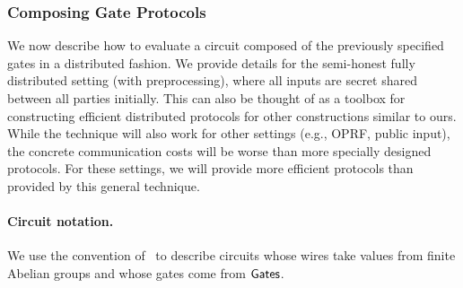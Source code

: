 \iffull
\subsubsection{Composing Gate Protocols}
We now describe how to evaluate a circuit composed of the previously specified gates in a distributed fashion. We provide details for the semi-honest fully distributed setting (with preprocessing), where all inputs are secret shared between all parties initially. This can also be thought of as a toolbox for constructing efficient distributed protocols for other constructions similar to ours. While the technique will also work for other settings (e.g., OPRF, public input), the concrete communication costs will be worse than more specially designed protocols. For these settings, we will provide more efficient protocols than provided by this general technique.

\paragraph{Circuit notation.}
We use the convention of~\cite{boyle2019-fss-preprocess} to describe circuits whose wires take values from finite Abelian groups and whose gates come from $\textnormal{\textsf{Gates}}$.
  
